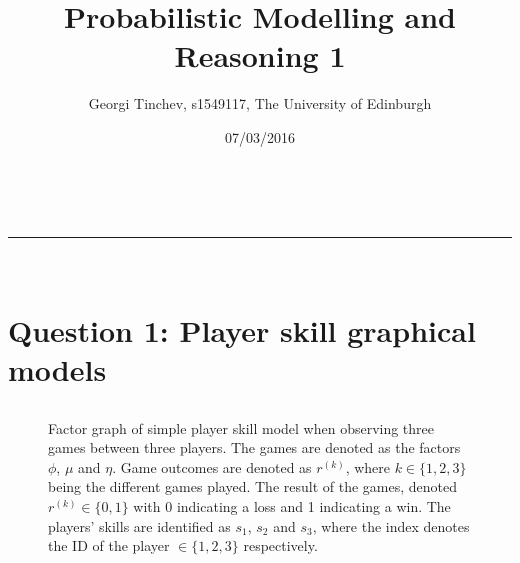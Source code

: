\documentclass[a4paper,11pt]{article}
\makeatletter
\newcommand{\linia}{\rule{\linewidth}{0.5pt}}
\theoremstyle{mytheor}
\renewcommand{\maketitle}{
\begin{center}
\vspace{2ex}
{\huge \textsc{\@title}}
\vspace{1ex}
\\
\linia\\
\@author \hfill \@date
\vspace{4ex}
\end{center}
}
\makeatother
\begin{document}
\title{Probabilistic Modelling and Reasoning \textnumero{} 1}

\author{Georgi Tinchev, s1549117, The University of Edinburgh}

\date{07/03/2016}

\maketitle

\section{Question 1: Player skill graphical models}


\subsection{}

\begin{figure}[htpb!]
    \centering
    \caption{Factor graph of simple player skill model when observing three games between three players. The games are denoted as the factors $\phi$, $\mu$ and $\eta$. Game outcomes are denoted as $r^{(k)}$, where $k\in{\{1,2,3\}}$ being the different games played. The result of the games, denoted $r^{(k)}\in{\{0,1\}}$ with 0 indicating a loss and 1 indicating a win. The players' skills are identified as $s_1$, $s_2$ and $s_3$, where the index denotes the ID of the player $\in{\{1,2,3\}}$ respectively.}
    \label{fig:fg}
\end{figure}
      
\subsection{}
\end{document}
